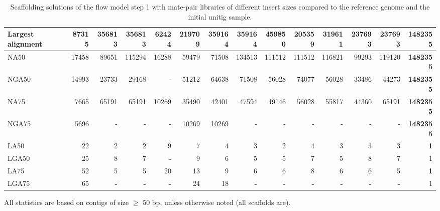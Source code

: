 \documentclass[12pt, twocolumn]{article}
\begin{document}
\begin{table}[ht]
\begin{center}
{\begin{tabular}{|l*{13}{|r}|}
Largest alignment & 87315 & 356813 & 356813 & 62424 & 219709 & 359164 & 359164 & 459850 & 205359 & 319611 & 237693 & 237693 & {\bf 1482355} \\ \hline
NA50 & 17458 & 89651 & 115294 & 16288 & 59479 & 71508 & 134513 & 111512 & 111512 & 116821 & 99293 & 119120 & {\bf 1482355} \\ \hline
NGA50 & 14993 & 23733 & 29168 & - & 51212 & 64638 & 71508 & 56028 & 74077 & 56028 & 33486 & 44273 & {\bf 1482355} \\ \hline
NA75 & 7665 & 65191 & 65191 & 10269 & 35490 & 42401 & 47594 & 49146 & 56028 & 55817 & 44360 & 65191 & {\bf 1482355} \\ \hline
NGA75 & 5696 & - & - & - & 10269 & 10269 & - & - & - & - & - & - & {\bf 1482355} \\ \hline
LA50 & 22 & 2 & 2 & 9 & 7 & 4 & 3 & 2 & 4 & 3 & 3 & 3 & {\bf 1} \\ \hline
LGA50 & 25 & 8 & 7 & {\bf -} & 9 & 6 & 5 & 5 & 7 & 5 & 8 & 7 & 1 \\ \hline
LA75 & 52 & 5 & 5 & 20 & 13 & 9 & 6 & 6 & 8 & 6 & 6 & 5 & {\bf 1} \\ \hline
LGA75 & 65 & {\bf -} & {\bf -} & {\bf -} & 24 & 18 & {\bf -} & {\bf -} & {\bf -} & {\bf -} & {\bf -} & {\bf -} & 1 \\ \hline
\end{tabular}
}
\caption{Scaffolding solutions of the flow model step 1 with mate-pair libraries of different insert sizes compared to the reference genome and the initial unitig sample.}
\footnotesize All statistics are based on contigs of size $\geq$ 50 bp, unless otherwise noted (all scaffolds are).
\label{tab:insert}
\end{center}
\end{table}
\end{document}
